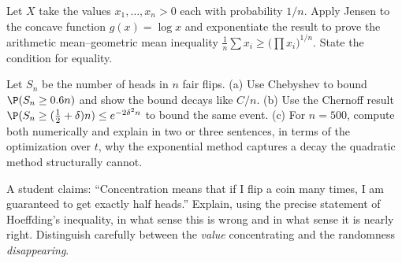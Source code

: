 \begin{exercise}
\label{ch19:ex-amgm}
Let $X$ take the values $x_1,\dots,x_n > 0$ each with probability $1/n$. Apply
Jensen to the concave function $g(x) = \log x$ and exponentiate the result to
prove the arithmetic mean--geometric mean inequality
$\frac1n\sum x_i \ge \bigl(\prod x_i\bigr)^{1/n}$. State the condition for
equality.
\end{exercise}

\begin{exercise}
\label{ch19:ex-proof}
Let $S_n$ be the number of heads in $n$ fair flips. (a) Use Chebyshev to bound
$\P(S_n \ge 0.6n)$ and show the bound decays like $C/n$. (b) Use the Chernoff
result $\P(S_n \ge (\tfrac12+\delta)n) \le e^{-2\delta^2 n}$ to bound the same
event. (c) For $n = 500$, compute both numerically and explain in two or three
sentences, in terms of the optimization over $t$, why the exponential method
captures a decay the quadratic method structurally cannot.
\end{exercise}

\begin{exercise}
\label{ch19:ex-concept}
A student claims: ``Concentration means that if I flip a coin many times, I am
guaranteed to get exactly half heads.'' Explain, using the precise statement of
Hoeffding's inequality, in what sense this is wrong and in what sense it is
nearly right. Distinguish carefully between the \emph{value} concentrating and
the randomness \emph{disappearing}.
\end{exercise}
